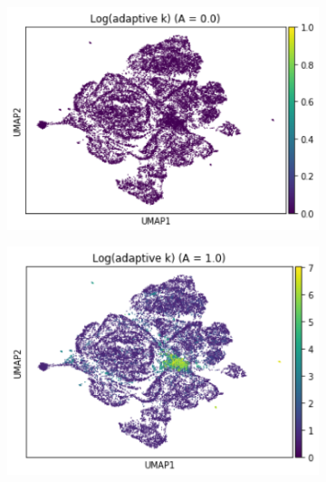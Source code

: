 \documentclass{article}
\begin{document}
\begin{figure}
    \begin{subfigure}[t]{0.32\textwidth}
    \centering
        \includegraphics[width=\linewidth]{figs/notMNIST/notMNIST_logadaK_Aeq0.png} 
    \end{subfigure}
    \begin{subfigure}[t]{0.32\textwidth}
        \centering
        \includegraphics[width=\linewidth]{figs/notMNIST/notMNIST_logadaK_Aeq1.png} 
    \end{subfigure}
    \begin{subfigure}[t]{0.32\textwidth}
        \centering

\end{subfigure}
\end{figure}
\end{document}
